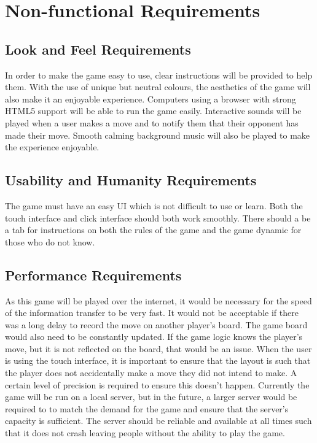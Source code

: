 \documentclass[12pt, titlepage]{article}
\begin{document}
\section{Non-functional Requirements}

\subsection{Look and Feel Requirements}
In order to make the game easy to use, clear instructions will be provided to
help them. With the use of unique but neutral colours, the aesthetics of the
game will also make it an enjoyable experience. Computers using a browser with
strong HTML5 support will be able to run the game easily. Interactive sounds
will be played when a user makes a move and to notify them that their opponent
has made their move. Smooth calming background music will also be played to make
the experience enjoyable.

\subsection{Usability and Humanity Requirements}
The game must have an easy UI which is not difficult to use or learn. Both the
touch interface and click interface should both work smoothly. There should a be
a tab for instructions on both the rules of the game and the game dynamic for 
those who do not know.

\subsection{Performance Requirements}
As this game will be played over the internet, it would be necessary for the
speed of the information transfer to be very fast. It would not be acceptable if
there was a long delay to record the move on another player's board. The game
board would also need to be constantly updated. If the game logic knows the
player's move, but it is not reflected on the board, that would be an issue.
When the user is using the touch interface, it is important to ensure that the
layout is such that the player does not accidentally make a move they did not
intend to make. A certain level of precision is required to ensure this doesn't
happen. Currently the game will be run on a local server, but in the future, a
larger server would be required to to match the demand for the game and ensure
that the server's capacity is sufficient. The server should be reliable and
available at all times such that it does not crash leaving people without the
ability to play the game.
\end{document}
